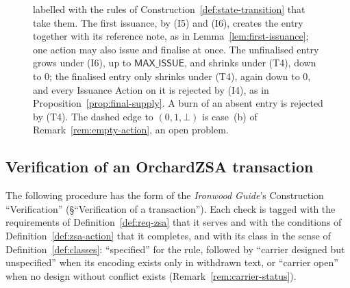 \documentclass[11pt,a4paper]{article}
\theoremstyle{definition}
\begin{document}
\begin{figure}[ht]
{labelled with the rules of Construction~\ref{def:state-transition} that take
them. The first issuance, by (I5) and (I6), creates the entry together with its
reference note, as in Lemma~\ref{lem:first-issuance}; one action may also issue
and finalise at once. The unfinalised entry grows under (I6), up to
$\mathsf{MAX\_ISSUE}$, and shrinks under (T4), down to $0$; the finalised entry
only shrinks under (T4), again down to $0$, and every Issuance Action on it is
rejected by (I4), as in Proposition~\ref{prop:final-supply}. A burn of an absent
entry is rejected by (T4). The dashed edge to $(0, 1, \bot)$ is case~(b) of
Remark~\ref{rem:empty-action}, an open problem.}
\label{fig:issuance-state}
\end{figure}

\FloatBarrier
\subsection{Verification of an OrchardZSA transaction}
\label{sec:state-verify}

The following procedure has the form of the \emph{Ironwood Guide}'s
Construction ``Verification'' (\S``Verification of a transaction''). Each
check is tagged with the requirements of Definition~\ref{def:req-zsa} that
it serves and with the conditions of Definition~\ref{def:zsa-action} that it
completes, and with its class in the sense of Definition~\ref{def:classes}:
``specified'' for the rule, followed by ``carrier designed but
unspecified'' when its encoding exists only in withdrawn text, or ``carrier
open'' when no design without conflict exists (Remark~\ref{rem:carrier-status}).
\end{document}
